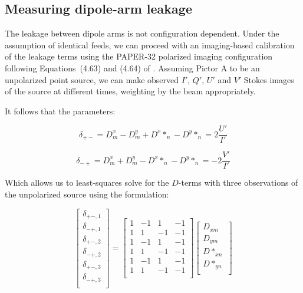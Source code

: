 \documentclass[10pt,a4paper,notitlepage]{article}
\begin{document}
\subsection{Measuring dipole-arm leakage}
\label{subsec:method_dterms}
The leakage between dipole arms is not configuration dependent. Under the assumption of identical feeds, we can proceed with an imaging-based calibration of the leakage terms using the PAPER-32 polarized imaging configuration following Equations~(4.63) and (4.64) of \cite{TMS}. Assuming Pictor A to be an unpolarized point source, we can make observed $I'$, $Q'$, $U'$ and $V'$ Stokes images of the source at different times, weighting by the beam appropriately.  

It follows that the parameters:

\begin{equation}
\delta_{+-} = D^x_m - D^y_m + D^x*_n - D^y*_n = 2\frac{U'}{I'}
\end{equation}

\begin{equation}
\delta_{-+} = D^x_m + D^y_m - D^x*_n - D^y*_n = -2\frac{V'}{I'}
\end{equation}

\noindent Which allows us to least-squares solve for the $D$-terms with three observations of the unpolarized source using the formulation:

\begin{equation}
\begin{bmatrix}
\delta_{+-,1} \\
\delta_{-+,1} \\
\delta_{+-,2} \\
\delta_{-+,2} \\
\delta_{+-,3} \\
\delta_{-+,3} \\
\end{bmatrix}
=
\begin{bmatrix}
1 & -1 & 1 & -1 \\
1 & 1 & -1 & -1 \\
1 & -1 & 1 & -1 \\
1 & 1 & -1 & -1 \\
1 & -1 & 1 & -1 \\
1 & 1 & -1 & -1 \\
\end{bmatrix}
\begin{bmatrix}
D_{xm}\\
D_{ym}\\
D*_{xn}\\
D*_{yn}\\
\end{bmatrix}
\end{equation}
\end{document}
